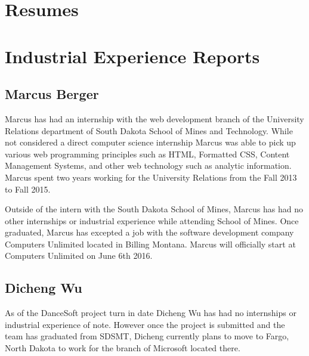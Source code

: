 


\section{Resumes}




\section{Industrial Experience Reports}

\subsection{Marcus Berger}

Marcus has had an internship with the web development branch of the University Relations department of South Dakota School of Mines and Technology. While not considered a direct computer science internship Marcus was able to pick up various web programming principles such as HTML, Formatted CSS, Content Management Systems, and other web technology such as analytic information. Marcus spent two years working for the University Relations from the Fall 2013 to Fall 2015. 

Outside of the intern with the South Dakota School of Mines, Marcus has had no other internships or industrial experience while attending School of Mines. Once graduated, Marcus has excepted a job with the software development company Computers Unlimited located in Billing Montana. Marcus will officially start at Computers Unlimited on June 6th 2016.  

\subsection{Dicheng Wu}

As of the DanceSoft project turn in date Dicheng Wu has had no internships or industrial experience of note. However once the project is submitted and the team has graduated from SDSMT, Dicheng currently plans to move to Fargo, North Dakota to work for the branch of Microsoft located there.  



